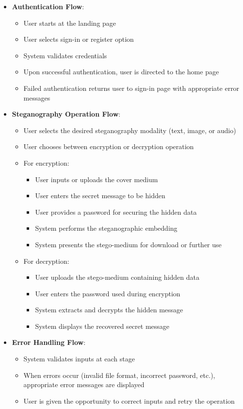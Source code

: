 \documentclass[12pt, a4paper, oneside]{book}
\begin{document}
\begin{itemize}[leftmargin=*]
    \item \textbf{Authentication Flow}:
    \begin{itemize}
        \item User starts at the landing page
        \item User selects sign-in or register option
        \item System validates credentials
        \item Upon successful authentication, user is directed to the home page
        \item Failed authentication returns user to sign-in page with appropriate error messages
    \end{itemize}

    \item \textbf{Steganography Operation Flow}:
    \begin{itemize}
        \item User selects the desired steganography modality (text, image, or audio)
        \item User chooses between encryption or decryption operation
        \item For encryption:
        \begin{itemize}
            \item User inputs or uploads the cover medium
            \item User enters the secret message to be hidden
            \item User provides a password for securing the hidden data
            \item System performs the steganographic embedding
            \item System presents the stego-medium for download or further use
        \end{itemize}
        \item For decryption:
        \begin{itemize}
            \item User uploads the stego-medium containing hidden data
            \item User enters the password used during encryption
            \item System extracts and decrypts the hidden message
            \item System displays the recovered secret message
        \end{itemize}
    \end{itemize}

    \item \textbf{Error Handling Flow}:
    \begin{itemize}
        \item System validates inputs at each stage
        \item When errors occur (invalid file format, incorrect password, etc.), appropriate error messages are displayed
        \item User is given the opportunity to correct inputs and retry the operation
    \end{itemize}
\end{itemize}
\end{document}
